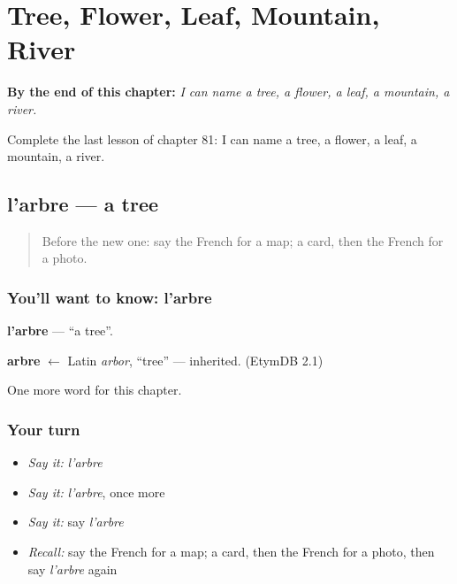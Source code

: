 
\chapter{Tree, Flower, Leaf, Mountain, River}
\label{ch:fr-tree-flower-leaf-mountain-river}

\begin{chapteropening}
\textbf{By the end of this chapter:} \emph{I can name a tree, a flower, a leaf, a mountain, a river.}

Complete the last lesson of chapter 81: I can name a tree, a flower, a leaf, a mountain, a river.
\end{chapteropening}

\section[l'arbre]{l'arbre — a tree}

\label{lesson:FR-C81-arbre}



\begin{quote}
Before the new one: say the French for a map; a card, then the French for a photo.
\end{quote}

\subsection*{You'll want to know: l'arbre}
\textbf{l'arbre} — \textquotedblleft{}a tree\textquotedblright{}.

\begin{cousinweb}
\textbf{arbre} $\leftarrow$ Latin \emph{arbor}, \textquotedblleft{}tree\textquotedblright{} — inherited. (EtymDB 2.1)
\end{cousinweb}

\begin{grammarlens}[title={What you've built}]
One more word for this chapter.
\end{grammarlens}

\subsection*{Your turn}
\begin{itemize}
\raggedright
  \item \emph{Say it:} \emph{l'arbre}
  \item \emph{Say it:} \emph{l'arbre}, once more
  \item \emph{Say it:} say \emph{l'arbre}
  \item \emph{Recall:} say the French for a map; a card, then the French for a photo, then say \emph{l'arbre} again
\end{itemize}

